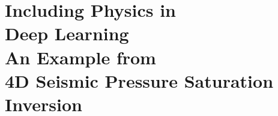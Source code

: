\chapter[Including Physics in Deep Learning – An Example from 4D Seismic Pressure Saturation Inversion]{Including Physics in\\Deep Learning\\An Example from\\4D Seismic Pressure Saturation Inversion}

{\vfill\hfill\newline{}}



